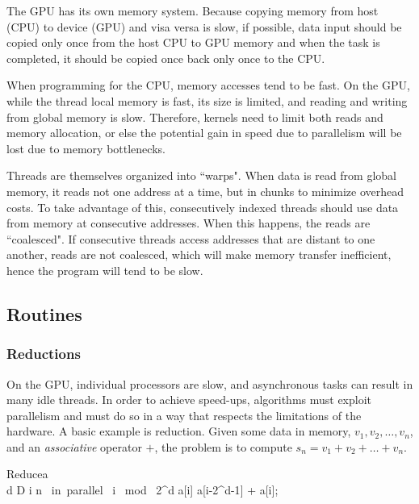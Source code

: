 The GPU has its own memory system. Because copying memory from host (CPU) to device (GPU) and visa versa is slow, if possible, data input should be copied only once from the host CPU to GPU memory and when the task is completed, it should be copied once back only once to the CPU.

When programming for the CPU, memory accesses tend to be fast. On the GPU, while the thread local memory is fast, its size is limited, and reading and writing from global memory is slow. Therefore, kernels need to limit both reads and memory allocation, or else the potential gain in speed due to parallelism will be lost due to memory bottlenecks.

Threads are themselves organized into ``warps". When data is read from global memory, it reads not one address at a time, but in chunks to minimize overhead costs. To take advantage of this, consecutively indexed threads should use data from memory at consecutive addresses. When this happens, the reads are ``coalesced". If consecutive threads access addresses that are distant to one another, reads are not coalesced, which will make memory transfer inefficient, hence the program will tend to be slow.

\subsection{Routines}
\label{sec:routines}
\subsubsection{Reductions}
\label{subsec:reduce}
On the GPU, individual processors are slow, and asynchronous tasks can result in many idle threads. In order to achieve speed-ups, algorithms must exploit parallelism and must do so in a way that respects the limitations of the hardware. A basic example is reduction. Given some data in memory, $v_1, v_2, \ldots, v_n$, and an \textit{associative} operator $+$, the problem is to compute $s_n=v_1 + v_2 + \ldots + v_n$. 

\begin{pseudocode}[ruled]{Reduce}{a}
\label{upsweep}
\\
\FOR d  \TO D \DO \BEGIN
  \FOR i  \TO n \mbox{ in parallel }\DO \BEGIN
    \IF i \mbox{ mod } 2^d \DO \BEGIN
    a[i] \GETS a[i-2^{d-1}] + a[i];\\
    \END \END \END
{}
\end{pseudocode}

